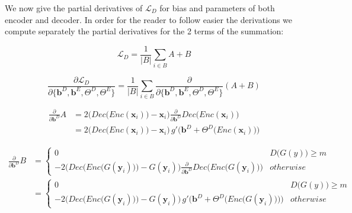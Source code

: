 We now give the partial derivatives of $\mathcal{L}_{D}$ for bias and parameters of both encoder and decoder. In order for the reader to follow easier the derivations we compute separately the partial derivatives for the 2 terms of the summation:

\[
\mathcal{L}_{D} = \frac{1}{|B|} \sum_{i \in B} A + B
\]

\vspace{10pt}

\[
\frac{\partial \mathcal{L}_{D}}{\partial \{ \mathbf{b}^{D}, \mathbf{b}^{E}, \Theta^{D}, \Theta^{E}\}} = \frac{1}{|B|} \sum_{i \in B} \frac{\partial}{\partial \{ \mathbf{b}^{D}, \mathbf{b}^{E}, \Theta^{D}, \Theta^{E}\}} (A + B)
\]

\[
    \begin{split}
        \frac{\partial}{\partial \mathbf{b}^{D}} A
        & = 2 \Big(Dec\big(Enc(\mathbf{x}_i)\big) - \mathbf{x}_{i}\Big) \frac{\partial}{\partial \mathbf{b}^{D}}  Dec\big(Enc(\mathbf{x}_i)\big) \\[10pt]
        & = 2 \Big(Dec\big(Enc(\mathbf{x}_i)\big) - \mathbf{x}_{i}\Big) \, g'\Big(\mathbf{b}^{D} + \Theta^{D}\big(Enc(\mathbf{x}_{i})\big)\Big)
    \end{split}
\]

\vspace{10pt}

\[
    \begin{split}
        \frac{\partial}{\partial \mathbf{b}^{D}} B
        & =
        \begin{cases}
            0 & D\big(G(y)\big) \geq m \\
            - 2 \bigg(Dec\Big(Enc\big(G(\mathbf{y}_i)\big)\Big) - G(\mathbf{y}_{i})\bigg) \frac{\partial}{\partial \mathbf{b}^{D}} Dec\Big(Enc\big(G(\mathbf{y}_i)\big)\Big) & otherwise
        \end{cases} \\[10pt]
        & =
        \begin{cases}
            0 & D\big(G(y)\big) \geq m \\
            - 2 \bigg(Dec\Big(Enc\big(G(\mathbf{y}_i)\big)\Big) - G(\mathbf{y}_{i})\bigg) \, g'\bigg(\mathbf{b}^{D} + \Theta^{D}\Big(Enc\big(G(\mathbf{y}_{i})\big)\Big)\bigg) & otherwise
        \end{cases}
    \end{split}
\]

\vspace{10pt}

